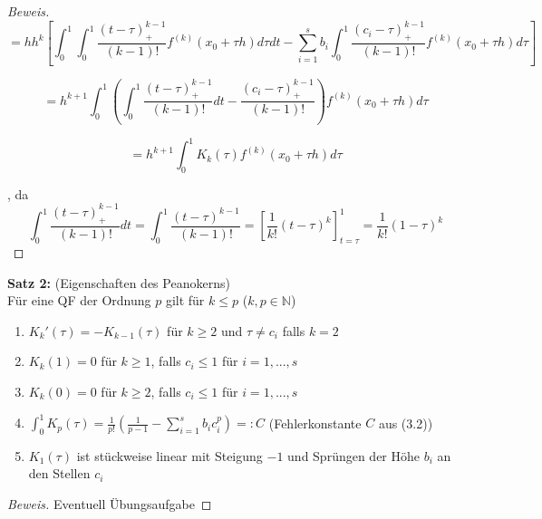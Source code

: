 \begin{nothing}
\begin{description}
\begin{proof}[Beweis]
    \begin{displaymath}
    = h h^k \left[ \int_0^1 \int_0^1 \frac{(t-\tau)^{k-1}_+}{(k-1)!} f^{(k)}(x_0+\tau h) d\tau dt - \sum_{i=1}^s b_i \int_0^1 \frac{(c_i - \tau)^{k-1}_+}{(k-1)!} f^{(k)}(x_0+\tau h) d\tau \right] 
    \end{displaymath}
    
    \begin{displaymath}
    = h^{k+1} \int_0^1 \left( \int_0^1 \frac{(t-\tau)_+^{k-1}}{(k-1)!} dt - \frac{(c_i - \tau)_+^{k-1}}{(k-1)!} \right) f^{(k)}(x_0+\tau h) d\tau
    \end{displaymath}
    
    \begin{displaymath}
    = h^{k+1} \int_0^1 K_k(\tau) f^{(k)}(x_0+\tau h) d\tau
    \end{displaymath}
    
    , da
    \begin{displaymath}
    \int_0^1 \frac{(t-\tau)^{k-1}_+}{(k-1)!} dt
    = \int_0^1 \frac{(t-\tau)^{k-1}}{(k-1)!}
    = \left[ \frac{1}{k!} (t-\tau)^k \right]_{t=\tau}^1
    = \frac{1}{k!} (1-\tau)^k
    \end{displaymath}
    \end{proof}
    
  \item \textbf{Satz 2:} (Eigenschaften des Peanokerns) \\
    Für eine QF der Ordnung $p$ gilt für $k \leq p$ ($k, p \in \mathbb{N}$) 
    \begin{enumerate}
      \item $K_k'(\tau) = -K_{k-1}(\tau)$ für $k \geq 2$ und $\tau \neq c_i$ falls $k=2$
      \item $K_k(1) = 0$ für $k \geq 1$, falls $c_i \leq 1$ für $i=1,..., s$
      \item $K_k(0) = 0$ für $k \geq 2$, falls $c_i \leq 1$ für $i=1,..., s$
      \item $\int_0^1 K_p(\tau) = \frac{1}{p!} \left(\frac{1}{p-1} - \sum_{i=1}^s b_i c_i^p \right)=: C$ (Fehlerkonstante $C$ aus (3.2))
      \item $K_1(\tau)$ ist stückweise linear mit Steigung $-1$ und Sprüngen der Höhe $b_i$ an den Stellen $c_i$
    \end{enumerate}
  
  \item
  \begin{proof}[Beweis]
    Eventuell Übungsaufgabe
  \end{proof}
  

\end{description}
\end{nothing}

